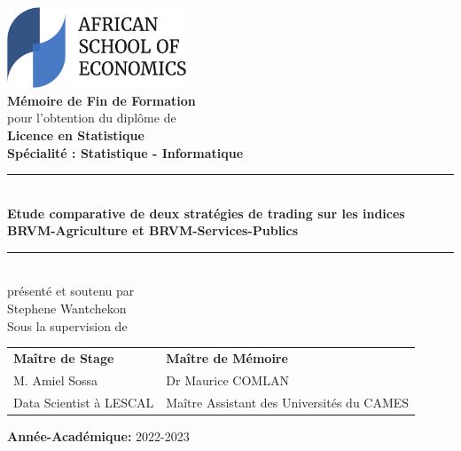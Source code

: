 
\begin{center}
    \includegraphics[width=0.40\textwidth]{logo/ASE} \\\vspace*{1cm}
    \Huge \textbf{Mémoire de Fin de Formation}\normalsize\\\vspace*{1cm}
    \Large pour l'obtention du diplôme de \\\vfill
    \LARGE \textbf{Licence en Statistique} \\\vfill
    \Large\textbf{Spécialité : Statistique - Informatique} \\\vfill
    \textcolor{blue}{\rule{0.95\textwidth}{2pt}}\vspace{0.9\baselineskip}\\
    \large\textbf{Etude comparative de deux stratégies de trading sur les indices BRVM-Agriculture et BRVM-Services-Publics}\normalsize\vspace{0.5\baselineskip}\\
    \textcolor{blue}{\rule{0.95\textwidth}{2pt}}\\\vfill
    présenté et soutenu par \\\vfill 
    Stephene Wantchekon \normalsize \\\vfill
    Sous la supervision de \\\vfill

    \begin{table}[h]
        \begin{tabular}{p{8cm} p{10cm}}
            \textbf{Maître de Stage}& \textbf{Maître de Mémoire}\vspace{0.2cm}\\
        M. Amiel Sossa & Dr Maurice COMLAN \vspace{0.2cm} \\
            Data Scientist à LESCAL & Maître Assistant des Universités du CAMES
        \end{tabular}
    \end{table}

     \textbf{Année-Académique:} 2022-2023
\end{center}

